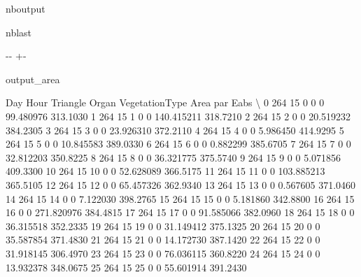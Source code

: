 \documentclass[letterpaper,10pt,english]{sphinxmanual}
\begin{document}
\begin{sphinxuseclass}{nboutput}
\begin{sphinxuseclass}{nblast}
{

\kern-\sphinxverbatimsmallskipamount\kern-\baselineskip
\kern+\FrameHeightAdjust\kern-\fboxrule
\vspace{\nbsphinxcodecellspacing}

\begin{sphinxuseclass}{output_area}
\begin{sphinxuseclass}{}


\begin{sphinxVerbatim}[commandchars=\\\{\}]
    Day  Hour  Triangle  Organ  VegetationType        Area  par Eabs  \textbackslash{}
0   264    15         0      0               0   99.480976  313.1030
1   264    15         1      0               0  140.415211  318.7210
2   264    15         2      0               0   20.519232  384.2305
3   264    15         3      0               0   23.926310  372.2110
4   264    15         4      0               0    5.986450  414.9295
5   264    15         5      0               0   10.845583  389.0330
6   264    15         6      0               0    0.882299  385.6705
7   264    15         7      0               0   32.812203  350.8225
8   264    15         8      0               0   36.321775  375.5740
9   264    15         9      0               0    5.071856  409.3300
10  264    15        10      0               0   52.628089  366.5175
11  264    15        11      0               0  103.885213  365.5105
12  264    15        12      0               0   65.457326  362.9340
13  264    15        13      0               0    0.567605  371.0460
14  264    15        14      0               0    7.122030  398.2765
15  264    15        15      0               0    5.181860  342.8800
16  264    15        16      0               0  271.820976  384.4815
17  264    15        17      0               0   91.585066  382.0960
18  264    15        18      0               0   36.315518  352.2335
19  264    15        19      0               0   31.149412  375.1325
20  264    15        20      0               0   35.587854  371.4830
21  264    15        21      0               0   14.172730  387.1420
22  264    15        22      0               0   31.918145  306.4970
23  264    15        23      0               0   76.036115  360.8220
24  264    15        24      0               0   13.932378  348.0675
25  264    15        25      0               0   55.601914  391.2430

\end{sphinxVerbatim}
\end{sphinxuseclass}
\end{sphinxuseclass}}
\end{sphinxuseclass}
\end{sphinxuseclass}
\end{document}
